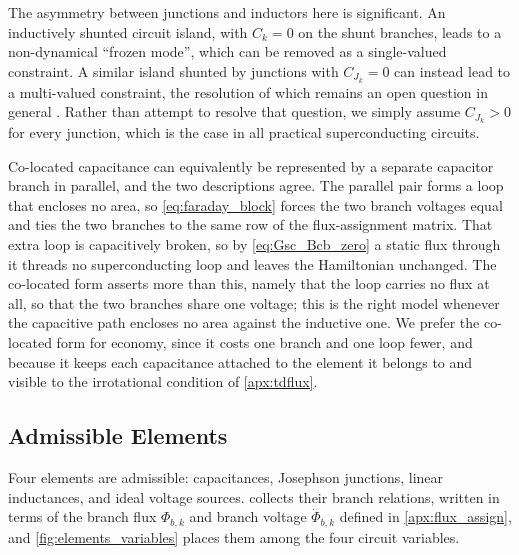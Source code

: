 \documentclass[10pt,aps,pra,onecolumn,superscriptaddress,floatfix,nofootinbib]{revtex4-2}
\begin{document}
The asymmetry between junctions and inductors here is significant.
An inductively shunted circuit island, with $C_k = 0$ on the shunt branches, leads to a non-dynamical ``frozen mode'', which can be removed as a single-valued constraint.
A similar island shunted by junctions with $C_{J_k} = 0$ can instead lead to a multi-valued constraint, the resolution of which remains an open question in general \cite{Eguisquiz_Reply_Consistent_2025,rymarz_consistent_2023}. Rather than attempt to resolve that question, we simply assume $C_{J_k} > 0$ for every junction, which is the case in all practical superconducting circuits.

Co-located capacitance can equivalently be represented by a separate capacitor branch in parallel, and the two descriptions agree.
The parallel pair forms a loop that encloses no area, so \cref{eq:faraday_block} forces the two branch voltages equal and ties the two branches to the same row of the flux-assignment matrix.
That extra loop is capacitively broken, so by \cref{eq:Gsc_Bcb_zero} a static flux through it threads no superconducting loop and leaves the Hamiltonian unchanged.
The co-located form asserts more than this, namely that the loop carries no flux at all, so that the two branches share one voltage; this is the right model whenever the capacitive path encloses no area against the inductive one.
We prefer the co-located form for economy, since it costs one branch and one loop fewer, and because it keeps each capacitance attached to the element it belongs to and visible to the irrotational condition of \cref{apx:tdflux}.

\subsection{Admissible Elements}\label{sec:elements}

Four elements are admissible: capacitances, Josephson junctions, linear inductances, and ideal voltage sources.
 collects their branch relations, written in terms of the branch flux $\Phi_{b,k}$ and branch voltage $\dot\Phi_{b,k}$ defined in \cref{apx:flux_assign}, and \cref{fig:elements_variables} places them among the four circuit variables.
\end{document}
